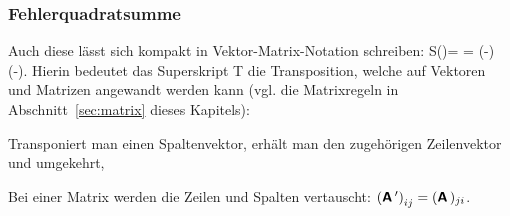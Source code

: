 \subsubsection{Fehlerquadratsumme}

Auch diese l\"asst sich kompakt in Vektor-Matrix-Notation schreiben:
\be
\label{FlinMatrix}
S(\vec{\beta})=\vec{\epsilon}\tr \cdot \vec{\epsilon}
 = \left(-\cdot\vec{\beta}\right)\tr \cdot
    \left(-\cdot\vec{\beta}\right).
\ee
Hierin bedeutet das Superskript T die Transposition, welche auf
Vektoren und Matrizen angewandt werden kann (vgl. die Matrixregeln in
Abschnitt~\ref{sec:matrix} dieses Kapitels):
\bi
\item Transponiert man einen Spaltenvektor, erh\"alt man den zugeh\"origen
Zeilenvektor und umgekehrt,
\item Bei einer Matrix werden die Zeilen und Spalten vertauscht:
$\left(\textbf{\textsf{A}}\,'\right)_{ij} = (\textbf{\textsf{A}}\,)_{ji}$.
\ei

